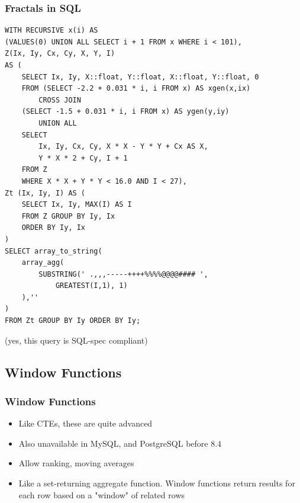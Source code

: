 \documentclass{beamer}
\begin{document}
\begin{frame}[fragile]
    \frametitle{Fractals in SQL}
    \tiny
    \begin{verbatim}
WITH RECURSIVE x(i) AS
(VALUES(0) UNION ALL SELECT i + 1 FROM x WHERE i < 101),
Z(Ix, Iy, Cx, Cy, X, Y, I)
AS (
    SELECT Ix, Iy, X::float, Y::float, X::float, Y::float, 0
    FROM (SELECT -2.2 + 0.031 * i, i FROM x) AS xgen(x,ix)
        CROSS JOIN
    (SELECT -1.5 + 0.031 * i, i FROM x) AS ygen(y,iy)
        UNION ALL
    SELECT
        Ix, Iy, Cx, Cy, X * X - Y * Y + Cx AS X,
        Y * X * 2 + Cy, I + 1
    FROM Z
    WHERE X * X + Y * Y < 16.0 AND I < 27),
Zt (Ix, Iy, I) AS (
    SELECT Ix, Iy, MAX(I) AS I
    FROM Z GROUP BY Iy, Ix
    ORDER BY Iy, Ix
)
SELECT array_to_string(
    array_agg(
        SUBSTRING(' .,,,-----++++%%%%@@@@#### ',
            GREATEST(I,1), 1)
    ),''
)
FROM Zt GROUP BY Iy ORDER BY Iy;
    \end{verbatim}
    \normalsize
    (yes, this query is SQL-spec compliant)
\end{frame}

\begin{frame}
\end{frame}

\subsection{Window Functions}
\begin{frame}
    \frametitle{Window Functions}
    \begin{itemize}
        \item Like CTEs, these are quite advanced
        \pause
        \item Also unavailable in MySQL, and PostgreSQL before 8.4
        \pause
        \item Allow ranking, moving averages
        \pause
        \item Like a set-returning aggregate function. Window functions return results for each row based on a "window" of related rows
    \end{itemize}
\end{frame}
\end{document}
